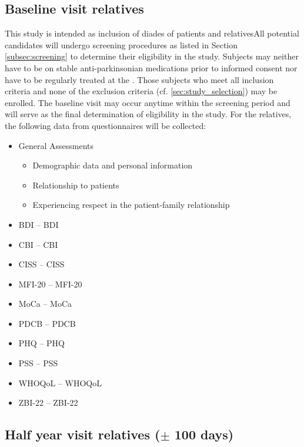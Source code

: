 \subsection{Baseline visit relatives}
This study is intended as inclusion of diades of patients and relativesAll potential candidates will undergo screening procedures as listed in Section \ref{subsec:screening} to determine their eligibility in the study. Subjects may neither have to be on stable anti-parkinsonian medications prior to informed consent nor have to be regularly treated at the \UKGM. Those subjects who meet all inclusion criteria and none of the exclusion criteria (cf. \ref{sec:study_selection}) may be enrolled. The baseline visit may occur anytime within the screening period and will serve as the final  determination of eligibility in the study. For the relatives, the following data from questionnaires will be collected:
\begin{itemize}
\item General Assessments
\begin{itemize}
\item Demographic data and personal information
\item Relationship to patients
\item Experiencing respect in the patient-family relationship
\end{itemize}
\item \acl{BDI} -- \acs{BDI}
\item \acl{CBI} -- \acs{CBI}
\item \acl{CISS} -- \acs{CISS}
\item \acl{MFI-20} -- \acs{MFI-20}
\item \acl{MoCa} -- \acs{MoCa}
\item \acl{PDCB} -- \acs{PDCB}
\item \acl{PHQ} -- \acs{PHQ}
\item \acl{PSS} -- \acs{PSS}
\item \acl{WHOQoL} -- \acs{WHOQoL}
\item \acl{ZBI-22} -- \acs{ZBI-22}
\end{itemize}

\subsection{Half year visit relatives ($\pm$ 100 days)}

